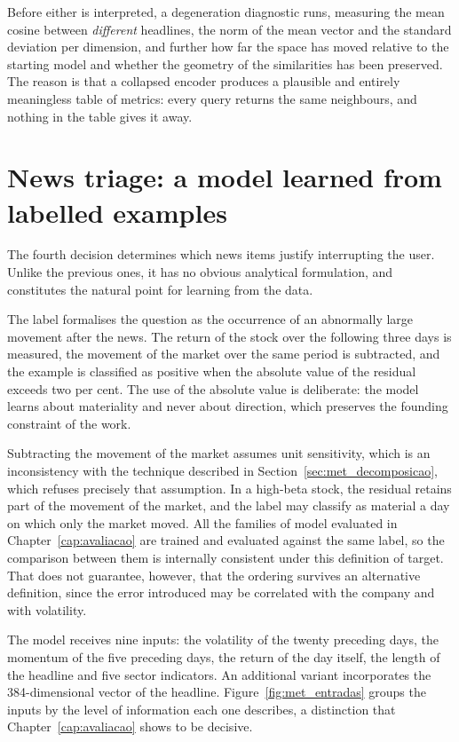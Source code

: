 Before either is interpreted, a degeneration diagnostic runs, measuring the mean cosine between
\emph{different} headlines, the norm of the mean vector and the standard deviation per dimension,
and further how far the space has moved relative to the starting model and whether the geometry
of the similarities has been preserved. The reason is that a collapsed encoder produces a
plausible and entirely meaningless table of metrics: every query returns the same neighbours, and
nothing in the table gives it away.


\section{News triage: a model learned from labelled examples}
\label{sec:met_triagem}

The fourth decision determines which news items justify interrupting the user. Unlike the previous
ones, it has no obvious analytical formulation, and constitutes the natural point for learning from
the data.

The label formalises the question as the occurrence of an abnormally large movement after the
news. The return of the stock over the following three days is measured, the movement of the market
over the same period is subtracted, and the example is classified as positive when the absolute
value of the residual exceeds two per cent. The use of the absolute value is deliberate: the model
learns about materiality and never about direction, which preserves the founding constraint of the
work.

Subtracting the movement of the market assumes unit sensitivity, which is an inconsistency with
the technique described in Section~\ref{sec:met_decomposicao}, which refuses precisely that
assumption. In a high-beta stock, the residual retains part of the movement of the market, and the
label may classify as material a day on which only the market moved. All the families of model
evaluated in Chapter~\ref{cap:avaliacao} are trained and evaluated against the same label, so the
comparison between them is internally consistent under this definition of target. That does not
guarantee, however, that the ordering survives an alternative definition, since the error
introduced may be correlated with the company and with volatility.

The model receives nine inputs: the volatility of the twenty preceding days, the momentum of the
five preceding days, the return of the day itself, the length of the headline and five sector
indicators. An additional variant incorporates the 384-dimensional vector of the headline.
Figure~\ref{fig:met_entradas} groups the inputs by the level of information each one describes, a
distinction that Chapter~\ref{cap:avaliacao} shows to be decisive.


